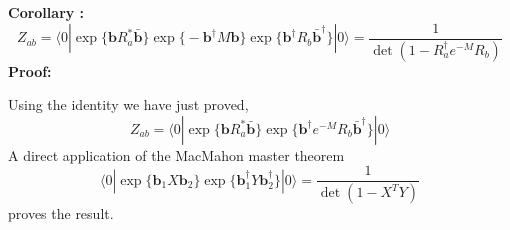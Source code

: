 \documentclass{article}
\renewcommand{\vec}[1]{\boldsymbol{\mathbf{#1}}}
\begin{document}
{\bf Corollary :} 
\begin{equation}
Z_{ab} = \langle 0 | \exp\Big\{ \vec{b} R_a^* \vec{\bar{b}}\Big\} \exp\Big\{ - \vec{b}^{\dagger} M  \vec{b} \Big\}   \exp\Big\{  \vec{b}^{\dagger} R_b  \vec{\bar{b}}^{\dagger}\Big\}  |0  \rangle  = \frac{1}{\det( 1- R_a^{\dagger} e^{-M} R_b )} 
\end{equation}
{\bf Proof:}

Using the identity we have just proved, 
\begin{equation}
Z_{ab} =   \langle 0 | \exp\Big\{ \vec{b} R_a^* \vec{\bar{b}}\Big\}  \exp \Big\{ \vec{b}^{\dagger} e^{-M}  R_b \bar{\vec{b}}^{\dagger}  \Big\}  |0 \rangle 
\end{equation}
A direct application of the MacMahon master theorem
\begin{equation}
  \langle 0 | \exp \Big\{ \vec{b}_1 X \vec{b}_2 \Big\}  \exp \Big\{ \vec{b}^{\dagger}_1 Y \vec{b}^{\dagger}_2 \Big\}|0  \rangle 
 = \frac{1}{\det(1 - X^T Y )}
\end{equation}
proves the result. 






\end{document}
